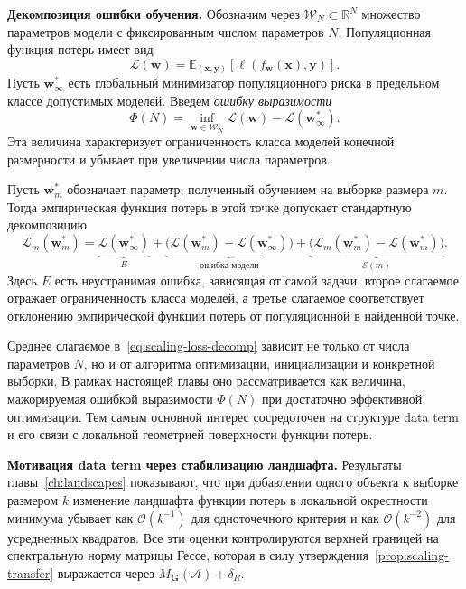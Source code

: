 \textbf{Декомпозиция ошибки обучения.} Обозначим через $\mathcal W_N \subset \mathbb R^N$ множество параметров модели с фиксированным числом параметров $N$. Популяционная функция потерь имеет вид
\begin{equation}
    \mathcal L(\mathbf w)
    =
    \mathbb E_{(\mathbf x,\mathbf y)}[\ell(f_{\mathbf w}(\mathbf x),\mathbf y)].
\end{equation}
Пусть $\mathbf w_{\infty}^*$ есть глобальный минимизатор популяционного риска в предельном классе допустимых моделей. Введем \emph{ошибку выразимости}
\begin{equation}
    \label{eq:scaling-Phi}
    \Phi(N)
    =
    \inf_{\mathbf w \in \mathcal W_N}
    \mathcal L(\mathbf w)
    -
    \mathcal L(\mathbf w_{\infty}^*).
\end{equation}
Эта величина характеризует ограниченность класса моделей конечной размерности и убывает при увеличении числа параметров.

Пусть $\mathbf w_m^*$ обозначает параметр, полученный обучением на выборке размера $m$. Тогда эмпирическая функция потерь в этой точке допускает стандартную декомпозицию
\begin{equation}
    \label{eq:scaling-loss-decomp}
    \mathcal L_m(\mathbf w_m^*)
    =
    \underbrace{\mathcal L(\mathbf w_{\infty}^*)}_{E}
    +
    \underbrace{\big(\mathcal L(\mathbf w_m^*)-\mathcal L(\mathbf w_{\infty}^*)\big)}_{\text{ошибка модели}}
    +
    \underbrace{\big(\mathcal L_m(\mathbf w_m^*)-\mathcal L(\mathbf w_m^*)\big)}_{\mathcal E(m)}.
\end{equation}
Здесь $E$ есть неустранимая ошибка, зависящая от самой задачи, второе слагаемое отражает ограниченность класса моделей, а третье слагаемое соответствует отклонению эмпирической функции потерь от популяционной в найденной точке.

\begin{remark}
    Среднее слагаемое в~\eqref{eq:scaling-loss-decomp} зависит не только от числа параметров $N$, но и от алгоритма оптимизации, инициализации и конкретной выборки. В рамках настоящей главы оно рассматривается как величина, мажорируемая ошибкой выразимости $\Phi(N)$ при достаточно эффективной оптимизации. Тем самым основной интерес сосредоточен на структуре data term и его связи с локальной геометрией поверхности функции потерь.
\end{remark}

\textbf{Мотивация data term через стабилизацию ландшафта.} Результаты главы~\ref{ch:landscapes} показывают, что при добавлении одного объекта к выборке размером $k$ изменение ландшафта функции потерь в локальной окрестности минимума убывает как $\mathcal O(k^{-1})$ для одноточечного критерия и как $\mathcal O(k^{-2})$ для усредненных квадратов. Все эти оценки контролируются верхней границей на спектральную норму матрицы Гессе, которая в силу утверждения~\ref{prop:scaling-transfer} выражается через $M_{\mathbf G}(\mathcal A)+\delta_R$.

